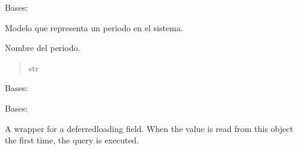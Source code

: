 \documentclass[letterpaper,10pt,spanish]{sphinxmanual}
\begin{document}
\begin{fulllineitems}

\pysigstartsignatures
{}
\pysigstopsignatures
\sphinxAtStartPar
Bases: 

\sphinxAtStartPar
Modelo que representa un periodo en el sistema.


\begin{fulllineitems}

\pysigstartsignatures
{}
\pysigstopsignatures
\sphinxAtStartPar
Nombre del periodo.
\begin{quote}\begin{description}
\sphinxAtStartPar
str

\end{description}\end{quote}

\end{fulllineitems}



\begin{fulllineitems}

\pysigstartsignatures
{}
\pysigstopsignatures
\sphinxAtStartPar
Bases: 

\end{fulllineitems}



\begin{fulllineitems}

\pysigstartsignatures
{}
\pysigstopsignatures
\sphinxAtStartPar
Bases: 

\end{fulllineitems}



\begin{fulllineitems}

\pysigstartsignatures
{}
\pysigstopsignatures
\sphinxAtStartPar
A wrapper for a deferred\sphinxhyphen{}loading field. When the value is read from this
object the first time, the query is executed.


\end{fulllineitems}
\end{fulllineitems}
\end{document}
